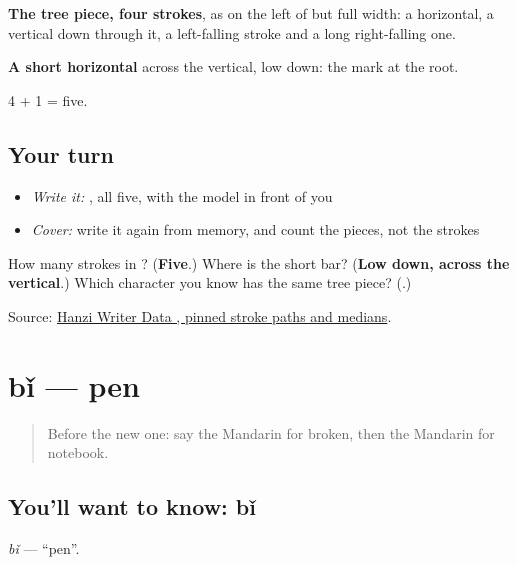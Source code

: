 \begin{quote}
\end{quote}

\textbf{The tree piece, four strokes}, as on the left of  but full width: a horizontal, a vertical down through it, a left-falling stroke and a long right-falling one.

\textbf{A short horizontal} across the vertical, low down: the mark at the root.

4 + 1 = five.

\subsection*{Your turn}
\begin{itemize}
\raggedright
  \item \emph{Write it:} , all five, with the model in front of you
  \item \emph{Cover:} write it again from memory, and count the pieces, not the strokes
\end{itemize}

\begin{tcolorbox}[breakable,colback=teal!4,colframe=teal!35!black,title={Before you move on}]
How many strokes in ? (\textbf{Five}.) Where is the short bar? (\textbf{Low down, across the vertical}.) Which character you know has the same tree piece? (\textbf{}.)

Source: \href{https://raw.githubusercontent.com/chanind/hanzi-writer-data/68d10a4b21150cae5e1ebbd223eed289cf32d90c/data/\%E6\%9C\%AC.json}{Hanzi Writer Data , pinned stroke paths and medians}.
\end{tcolorbox}
\section[bǐ]{bǐ — pen}

\label{lesson:ZH-C104-bi}



\begin{quote}
Before the new one: say the Mandarin for broken, then the Mandarin for notebook.
\end{quote}

\subsection*{You'll want to know: bǐ}
\emph{bǐ} — \textquotedblleft{}pen\textquotedblright{}.

